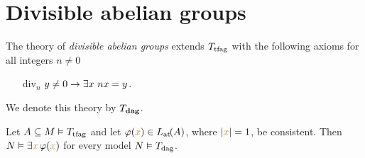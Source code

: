 \documentclass[creche.tex]{subfiles}
\begin{document}
% 
% 
% 



\section{Divisible abelian groups}

The theory of \emph{divisible abelian groups\/} extends $T_{\rm tfag}$ with the following axioms for all  integers $n\neq0$
\begin{itemize}
\item[div$_n$] $y\neq0\imp\E x\ nx=y$.
\end{itemize} 
We denote this theory by \emph{$T_{\rm\bf dag}$}.

\begin{proposition}\label{prop_md_cons_sodd}
Let $A\subseteq M\models T_{\rm tfag}$ and let $\phi({\mr x})\in\atL(A)$, where $|{\mr x}|=1$, be consistent. Then $N\models\E {\mr x} \,\phi({\mr x})$ for every model $N\models T_{\rm dag}$.
\end{proposition}
\end{document}

